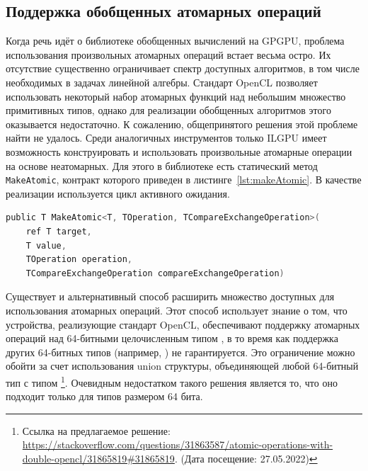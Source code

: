 
\subsection{Поддержка обобщенных атомарных операций}
Когда речь идёт о библиотеке обобщенных вычислений на GPGPU, проблема использования произвольных атомарных операций встает весьма остро. Их отсутствие существенно ограничивает спектр доступных алгоритмов, в том числе необходимых в задачах линейной алгебры. Стандарт OpenCL позволяет использовать некоторый набор атомарных функций над небольшим множество примитивных типов, однако для реализации обобщенных алгоритмов этого оказывается недостаточно. К сожалению, общепринятого решения этой проблеме найти не удалось. Среди аналогичных инструментов только ILGPU имеет возможность конструировать и использовать произвольные атомарные операции на основе неатомарных. Для этого в библиотеке есть статический метод \verb|MakeAtomic|, контракт которого приведен в листинге~\ref{lst:makeAtomic}. В качестве реализации используется цикл активного ожидания.

\begin{lstlisting}[caption= Контракт метода MakeAtomic, language=C, frame=single, label={lst:makeAtomic}]
public T MakeAtomic<T, TOperation, TCompareExchangeOperation>(
    ref T target,
    T value,
    TOperation operation,
    TCompareExchangeOperation compareExchangeOperation)
\end{lstlisting}

Существует и альтернативный способ расширить множество доступных для использования атомарных операций. Этот способ использует знание о том, что устройства, реализующие стандарт OpenCL, обеспечивают поддержку атомарных операций над 64-битными целочисленным типом , в то время как поддержка других 64-битных типов (например, ) не гарантируется. Это ограничение можно обойти за счет использования union структуры, объединяющей любой 64-битный тип с типом \footnote{Ссылка на предлагаемое решение: \url{https://stackoverflow.com/questions/31863587/atomic-operations-with-double-opencl/31865819#31865819}. (Дата посещение: 27.05.2022)}. Очевидным недостатком такого решения является то, что оно подходит только для типов размером 64 бита.

